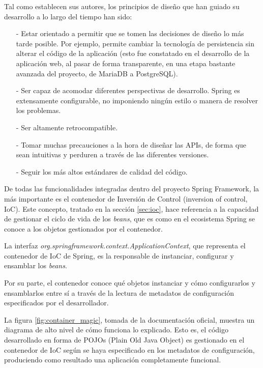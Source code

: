 \documentclass[a4paper]{article}
\begin{document}
    Tal como establecen sus autores, los principios de diseño que han guiado su desarrollo a lo largo del tiempo han sido:
    
    \begin{itemize}
    	\item[-] Estar orientado a permitir que se tomen las decisiones de diseño lo más tarde posible. Por ejemplo, permite cambiar la tecnología de persistencia sin alterar el código de la aplicación (esto fue constatado en el desarrollo de la aplicación web, al pasar de forma transparente, en una etapa bastante avanzada del proyecto, de MariaDB a PostgreSQL).
    	\item[-] Ser capaz de acomodar diferentes perspectivas de desarrollo. Spring es extensamente configurable, no imponiendo ningún estilo o manera de resolver los problemas.
    	\item[-] Ser altamente retrocompatible.
    	\item[-] Tomar muchas precauciones a la hora de diseñar las APIs, de forma que sean intuitivas y perduren a través de las diferentes versiones.
    	\item[-] Seguir los más altos estándares de calidad del código.
    \end{itemize}
    
    De todas las funcionalidades integradas dentro del proyecto Spring Framework, la más importante es el contenedor de Inversión de Control (inversion of control, IoC). Este concepto, tratado en la sección \ref{sec:ioc}, hace referencia a la capacidad de gestionar el ciclo de vida de los \emph{beans}, que es como en el ecosistema Spring se conoce a los objetos gestionados por el contenedor.
    
    La interfaz \emph{org.springframework.context.ApplicationContext}, que representa el contenedor de IoC de Spring, es la responsable de instanciar, configurar y ensamblar los \emph{beans}.
    
    Por su parte, el contenedor conoce qué objetos instanciar y cómo configurarlos y ensamblarlos entre sí a través de la lectura de metadatos de configuración especificados por el desarrollador.
    
    La figura \ref{fig:container_magic}, tomada de la documentación oficial, muestra un diagrama de alto nivel de cómo funciona lo explicado. Esto es, el código desarrollado en forma de POJOs (Plain Old Java Object) es gestionado en el contenedor de IoC según se haya especificado en los metadatos de configuración, produciendo como resultado una aplicación completamente funcional.
    
\end{document}
